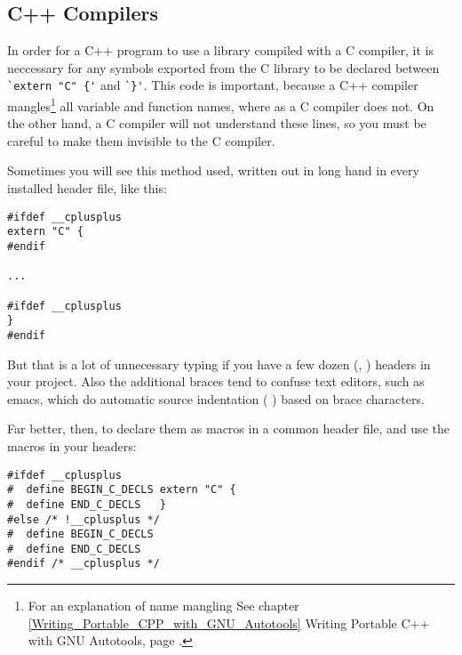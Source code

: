 \subsection{C++ Compilers}


In order for a C++ program to use a library compiled with a C compiler,
it is neccessary for any symbols exported from the C library to be declared
between \verb+`extern "C" {'+ and \verb+`}'+. This code is important,
because a C++ compiler mangles\footnote{For an explanation of name mangling 
See chapter \ref{Writing_Portable_CPP_with_GNU_Autotools} Writing 
Portable C++ with GNU Autotools,
page \pageref{Writing_Portable_CPP_with_GNU_Autotools}.}
all variable and function names, where as a C compiler does not. On the 
other hand, a C compiler will not understand these lines, so you must be 
careful to make them invisible to the C compiler. 


Sometimes you will see this method used, written out in long hand in every installed header file, like this: 

\begin{Verbatim}[frame=single]
#ifdef __cplusplus
extern "C" {
#endif

...

#ifdef __cplusplus
}
#endif
\end{Verbatim}

But that is a lot of unnecessary typing if you have a few dozen ({\MbQ{}}, {\McQ{}})
headers in your project. Also the additional braces tend to confuse text 
editors, such as emacs, which do automatic source indentation ({\McQ{}} {\MhQ{}})
based on brace characters. 


Far better, then, to declare them as macros in a common header file,
and use the macros in your headers: 



\begin{Verbatim}[frame=single]
#ifdef __cplusplus
#  define BEGIN_C_DECLS extern "C" {
#  define END_C_DECLS   }
#else /* !__cplusplus */
#  define BEGIN_C_DECLS
#  define END_C_DECLS
#endif /* __cplusplus */
\end{Verbatim}



